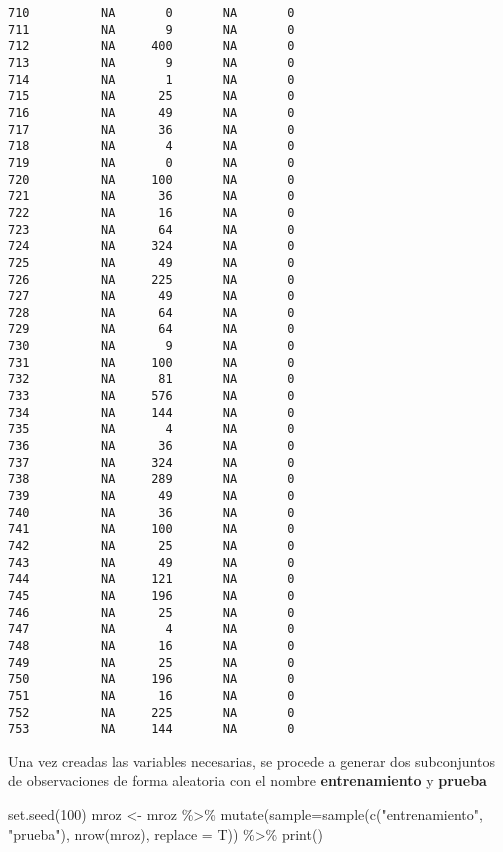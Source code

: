 \documentclass[
  letterpaper,
  DIV=11,
  numbers=noendperiod]{scrreprt}
\newenvironment{Shaded}{\begin{snugshade}}{\end{snugshade}}
\newcommand{\AttributeTok}[1]{\textcolor[rgb]{0.40,0.45,0.13}{#1}}
\newcommand{\DecValTok}[1]{\textcolor[rgb]{0.68,0.00,0.00}{#1}}
\newcommand{\FunctionTok}[1]{\textcolor[rgb]{0.28,0.35,0.67}{#1}}
\newcommand{\NormalTok}[1]{\textcolor[rgb]{0.00,0.23,0.31}{#1}}
\newcommand{\OtherTok}[1]{\textcolor[rgb]{0.00,0.23,0.31}{#1}}
\newcommand{\SpecialCharTok}[1]{\textcolor[rgb]{0.37,0.37,0.37}{#1}}
\newcommand{\StringTok}[1]{\textcolor[rgb]{0.13,0.47,0.30}{#1}}
\begin{document}
\begin{verbatim}
710          NA       0       NA       0
711          NA       9       NA       0
712          NA     400       NA       0
713          NA       9       NA       0
714          NA       1       NA       0
715          NA      25       NA       0
716          NA      49       NA       0
717          NA      36       NA       0
718          NA       4       NA       0
719          NA       0       NA       0
720          NA     100       NA       0
721          NA      36       NA       0
722          NA      16       NA       0
723          NA      64       NA       0
724          NA     324       NA       0
725          NA      49       NA       0
726          NA     225       NA       0
727          NA      49       NA       0
728          NA      64       NA       0
729          NA      64       NA       0
730          NA       9       NA       0
731          NA     100       NA       0
732          NA      81       NA       0
733          NA     576       NA       0
734          NA     144       NA       0
735          NA       4       NA       0
736          NA      36       NA       0
737          NA     324       NA       0
738          NA     289       NA       0
739          NA      49       NA       0
740          NA      36       NA       0
741          NA     100       NA       0
742          NA      25       NA       0
743          NA      49       NA       0
744          NA     121       NA       0
745          NA     196       NA       0
746          NA      25       NA       0
747          NA       4       NA       0
748          NA      16       NA       0
749          NA      25       NA       0
750          NA     196       NA       0
751          NA      16       NA       0
752          NA     225       NA       0
753          NA     144       NA       0
\end{verbatim}

Una vez creadas las variables necesarias, se procede a generar dos
subconjuntos de observaciones de forma aleatoria con el nombre
\textbf{entrenamiento} y \textbf{prueba}

\begin{Shaded}
\begin{Highlighting}[]
\FunctionTok{set.seed}\NormalTok{(}\DecValTok{100}\NormalTok{)}
\NormalTok{mroz }\OtherTok{\textless{}{-}}\NormalTok{ mroz }\SpecialCharTok{\%\textgreater{}\%} 
  \FunctionTok{mutate}\NormalTok{(}\AttributeTok{sample=}\FunctionTok{sample}\NormalTok{(}\FunctionTok{c}\NormalTok{(}\StringTok{"entrenamiento"}\NormalTok{, }\StringTok{"prueba"}\NormalTok{),  }
                      \FunctionTok{nrow}\NormalTok{(mroz), }
                      \AttributeTok{replace =}\NormalTok{ T)) }\SpecialCharTok{\%\textgreater{}\%} 
  \FunctionTok{print}\NormalTok{()}
\end{Highlighting}
\end{Shaded}
\end{document}
